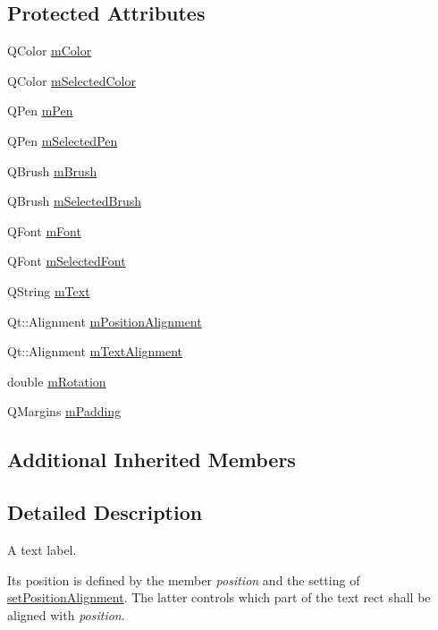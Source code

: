 \subsection*{Protected Attributes}
\begin{DoxyCompactItemize}
\item 
Q\+Color \hyperlink{classQCPItemText_a8407f284ad867f627878cc26ef433d08}{m\+Color}
\item 
Q\+Color \hyperlink{classQCPItemText_a7eb64e42f5f7998a97d8907ad25933c1}{m\+Selected\+Color}
\item 
Q\+Pen \hyperlink{classQCPItemText_aa02388705dbbff1bf7b8aa872b5f579c}{m\+Pen}
\item 
Q\+Pen \hyperlink{classQCPItemText_a8eaec649606d6ead2d8d4dcb5691777c}{m\+Selected\+Pen}
\item 
Q\+Brush \hyperlink{classQCPItemText_a2535911875faa459b8337f2efccb5cb8}{m\+Brush}
\item 
Q\+Brush \hyperlink{classQCPItemText_a28ccd097b42a216d81db9c6869f54a59}{m\+Selected\+Brush}
\item 
Q\+Font \hyperlink{classQCPItemText_a1dc87fe2a824820d549ffd7e644eef8d}{m\+Font}
\item 
Q\+Font \hyperlink{classQCPItemText_a6702f141fae590b2f4f1ec02fe9f8bd5}{m\+Selected\+Font}
\item 
Q\+String \hyperlink{classQCPItemText_a2dec3e08c11f51639629374ecec3bd62}{m\+Text}
\item 
Qt\+::\+Alignment \hyperlink{classQCPItemText_a6c27f7dc1a962a04b32430cf99f04654}{m\+Position\+Alignment}
\item 
Qt\+::\+Alignment \hyperlink{classQCPItemText_acdb2e50c38e83da00f083771efbd213f}{m\+Text\+Alignment}
\item 
double \hyperlink{classQCPItemText_ac37df0061552225d2277e1ee3b48f2cb}{m\+Rotation}
\item 
Q\+Margins \hyperlink{classQCPItemText_ae7b3ef0ce6046efd4b346d28f2e1fb67}{m\+Padding}
\end{DoxyCompactItemize}
\subsection*{Additional Inherited Members}


\subsection{Detailed Description}
A text label. 

 Its position is defined by the member {\itshape position} and the setting of \hyperlink{classQCPItemText_a781cdf8c640fc6a055dcff1e675c8c7a}{set\+Position\+Alignment}. The latter controls which part of the text rect shall be aligned with {\itshape position}.

